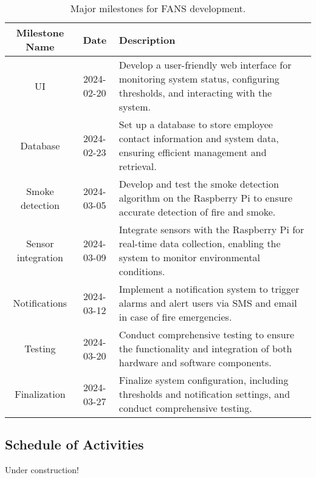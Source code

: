 \begin{table}[H]
    \centering
    \begin{tabular}{| c | c | p{9cm} |}
        \hline
        \textbf{Milestone Name} & \textbf{Date} & \textbf{Description}                                                                            \\
        \hline
        UI                      & 2024-02-20    & Develop a user-friendly web interface for monitoring system status, configuring thresholds, and
        interacting with the system.                                                                                                              \\
        \hline Database         & 2024-02-23    & Set up a database to store employee contact information
        and system data, ensuring efficient management and retrieval.                                                                             \\
        \hline Smoke detection  & 2024-03-05    & Develop and test
        the smoke detection algorithm on the Raspberry Pi to ensure accurate detection of fire and smoke.                                         \\
        \hline
        Sensor integration      & 2024-03-09    & Integrate sensors with the Raspberry Pi for real-time data collection, enabling the
        system to monitor environmental conditions.                                                                                               \\
        \hline
        Notifications           & 2024-03-12    & Implement a notification system to trigger alarms and alert users via SMS and email
        in case of fire emergencies.                                                                                                              \\
        \hline
        Testing                 & 2024-03-20    & Conduct comprehensive testing to ensure the functionality and integration of both
        hardware and software components.                                                                                                         \\
        \hline
        Finalization            & 2024-03-27    & Finalize system configuration, including thresholds and notification settings, and
        conduct comprehensive testing.                                                                                                            \\
        \hline
    \end{tabular}
    \caption{Major milestones for FANS development.}
\end{table}

\subsection{Schedule of Activities}

Under construction!


